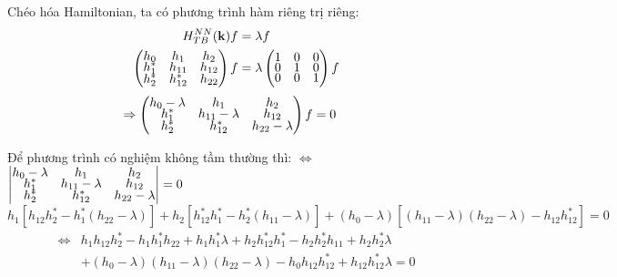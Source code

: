 \documentclass{report}
\begin{document}
\clearpage
Chéo hóa Hamiltonian, ta có phương trình hàm riêng trị riêng:
\begin{align*}
	H_{TB}^{NN}(\mathbf{k}) f & = \lambda f \\
	\begin{pmatrix}
		\renewcommand{\arraystretch}{0.72}
		h_0   & h_1      & h_2    \\
		h_1^* & h_{11}   & h_{12} \\
		h_2^* & h_{12}^* & h_{22}
	\end{pmatrix}f
	                          & = \lambda
	\begin{pmatrix}
		\renewcommand{\arraystretch}{0.72}
		1 & 0 & 0 \\
		0 & 1 & 0 \\
		0 & 0 & 1 \\
	\end{pmatrix}f
\end{align*}
\begin{align*}
	\Rightarrow
	\begin{pmatrix}
		\renewcommand{\arraystretch}{0.72}
		h_0 - \lambda & h_1              & h_2              \\
		h_1^*         & h_{11} - \lambda & h_{12}           \\
		h_2^*         & h_{12}^*         & h_{22} - \lambda
	\end{pmatrix}f
	 & = 0
\end{align*}

Để phương trình có nghiệm không tầm thường thì: $\Leftrightarrow$
$
	\begin{vmatrix}
		\renewcommand{\arraystretch}{0.5}
		h_0 - \lambda & h_1              & h_2              \\
		h_1^*         & h_{11} - \lambda & h_{12}           \\
		h_2^*         & h_{12}^*         & h_{22} - \lambda
	\end{vmatrix} = 0
$
\begin{equation*}
	h_{1}^{}\left[h_{12}^{}h_2^* - h_1^*(h_{22}^{} - \lambda)\right] + h_2^{}\left[h_{12}^* h_1^* - h_2^*(h_{11}^{} - \lambda) \right] + (h_0^{} - \lambda)\left[(h_{11}^{} - \lambda)(h_{22}^{} - \lambda) - h_{12}^{}h_{12}^*\right] = 0
\end{equation*}
\begin{align*}
	\Leftrightarrow & h_{1}^{} h_{12}^{} h_2^{*} - h_{1}^{} h_{1}^{*} h_{22}^{} + h_{1}^{} h_{1}^{*} \lambda + h_{2}^{} h_{12}^{*} h_1^{*} - h_{2}^{} h_{2}^{*} h_{11} + h_{2}^{} h_{2}^{*} \lambda \\
	                & + (h_{0}^{} - \lambda) (h_{11}^{} - \lambda) (h_{22}^{} - \lambda) - h_{0}^{} h_{12}^{} h_{12}^{*} + h_{12}^{} h_{12}^{*} \lambda = 0
\end{align*}
\end{document}
